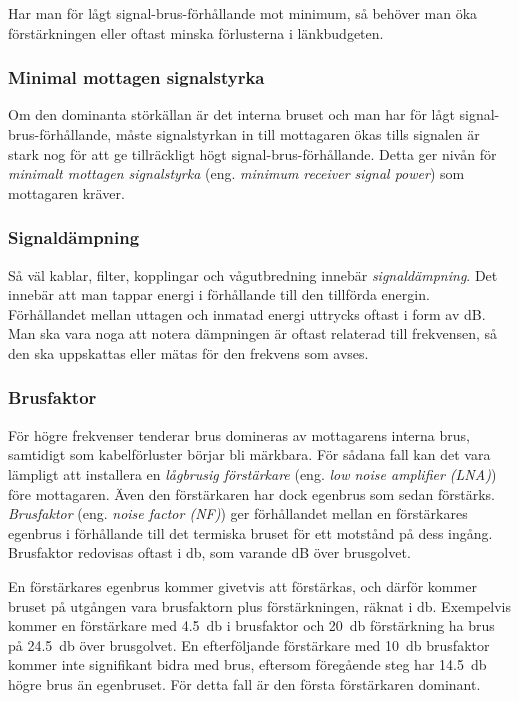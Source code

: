 Har man för lågt signal-brus-förhållande mot minimum, så behöver man öka
förstärkningen eller oftast minska förlusterna i länkbudgeten.

\subsubsection{Minimal mottagen signalstyrka}

Om den dominanta störkällan är det interna bruset och man har för lågt
signal-brus-förhållande, måste signalstyrkan in till mottagaren ökas
tills signalen är stark nog för att ge tillräckligt högt
signal-brus-förhållande.
Detta ger nivån för \emph{minimalt mottagen signalstyrka} (eng.
\emph{minimum receiver signal power}) som mottagaren kräver.

\subsubsection{Signaldämpning}

Så väl kablar, filter, kopplingar och vågutbredning innebär
\emph{signaldämpning}.
Det innebär att man tappar energi i förhållande till den tillförda energin.
Förhållandet mellan uttagen och inmatad energi uttrycks oftast i form av dB.
Man ska vara noga att notera dämpningen är oftast relaterad till frekvensen,
så den ska uppskattas eller mätas för den frekvens som avses.

\subsubsection{Brusfaktor}
\label{brusfaktor}

För högre frekvenser tenderar brus domineras av mottagarens interna brus,
samtidigt som kabelförluster börjar bli märkbara.
För sådana fall kan det vara lämpligt att installera en
\emph{lågbrusig förstärkare} (eng. \emph{low noise amplifier (LNA)}) före
mottagaren.
Även den förstärkaren har dock egenbrus som sedan förstärks.
\emph{Brusfaktor} (eng. \emph{noise factor (NF)}) ger förhållandet mellan en
förstärkares egenbrus i förhållande till det termiska bruset för ett motstånd
på dess ingång.
Brusfaktor redovisas oftast i \si{\decibel}, som varande dB över brusgolvet.

En förstärkares egenbrus kommer givetvis att förstärkas, och därför kommer
bruset på utgången vara brusfaktorn plus förstärkningen, räknat i \si{\decibel}.
Exempelvis kommer en förstärkare med \SI{4,5}{\decibel} i brusfaktor och
\SI{20}{\decibel} förstärkning ha brus på \SI{24,5}{\decibel} över brusgolvet.
En efterföljande förstärkare med \SI{10}{\decibel} brusfaktor kommer inte
signifikant bidra med brus, eftersom föregående steg har \SI{14,5}{\decibel}
högre brus än egenbruset.
För detta fall är den första förstärkaren dominant.

